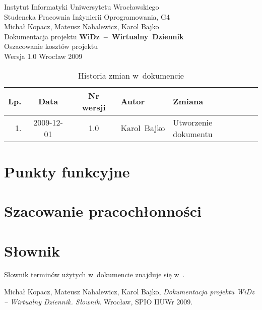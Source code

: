 \documentclass[12pt,leqno,twoside]{mwart}
\begin{document}
\begin{titlepage}
\begin{center}
Instytut Informatyki Uniwersytetu Wrocławskiego \\
Studencka Pracownia Inżynierii Oprogramowania, G4 \\
\vspace{4cm}
\Large Michał Kopacz, Mateusz Nahalewicz, Karol Bajko \\
\vspace{0.5cm}
\huge Dokumentacja projektu \mbox{\textbf{WiDz -- Wirtualny Dziennik}} \\ \Large Oszacowanie kosztów projektu\\
\vspace{1cm}
\normalsize Wersja 1.0
\vfill
\normalsize Wrocław 2009
\end{center}
\end{titlepage}

\newpage
\vfill
\begin{table}[tb]
	\centering
	\caption{Historia zmian w~dokumencie}
		\begin{tabular}{|r|c|c|p{}|l|}
		\hline
		Lp. 	& Data       & Nr wersji 	& Autor           		& Zmiana \\ \hline
		1.   	& 2009-12-01 & 1.0       	& \mbox{Karol Bajko} & Utworzenie dokumentu \\ \hline
		\end{tabular}
\end{table}

\tableofcontents
\newpage

\section{Punkty funkcyjne}

\section{Szacowanie pracochłonności}

\section{Słownik}
\noindent Słownik terminów użytych w~dokumencie znajduje się w~\cite{SLO}.

\begin{thebibliography}{99}
 Michał Kopacz, Mateusz Nahalewicz, Karol Bajko, {\it Dokumentacja projektu WiDz -- Wirtualny Dziennik. Słownik}. Wrocław, SPIO IIUWr 2009.
\end{thebibliography}
\end{document}
